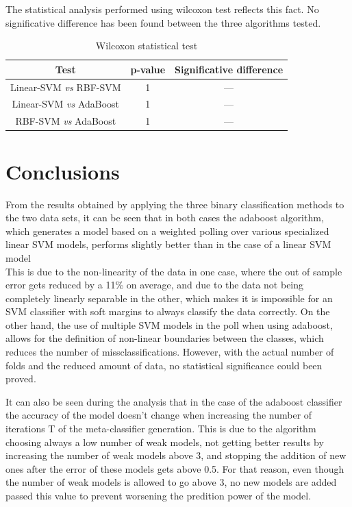 \documentclass[10pt, journal]{IEEEtran}
\begin{document}
The statistical analysis performed using wilcoxon test reflects this fact. No significative difference has been found between the three algorithms tested.\\
\begin{table}[ht!]
	\centering
	\begin{tabular}{|c|c|c|}
		\hline
		\textbf{Test} & \textbf{p-value} & \textbf{Significative difference}\\\hline
		Linear-SVM \emph{vs} RBF-SVM & 1 & —\\\hline
		Linear-SVM \emph{vs} AdaBoost & 1 & —\\\hline
		RBF-SVM \emph{vs} AdaBoost & 1 & —\\\hline
	\end{tabular}
	\label{tab:heartWilcoxonTest}
	\caption{Wilcoxon statistical test}
\end{table}

\section{Conclusions} %
\label{sec:conclusions}
From the results obtained by applying the three binary classification methods to the two data sets, it can be seen that in both cases the adaboost algorithm, which generates a model based on a weighted polling over various specialized linear SVM models, performs slightly better than in the case of a linear SVM model\\

This is due to the non-linearity of the data in one case, where the out of sample error gets reduced by a 11\% on average, and due to the data not being completely linearly separable in the other, which makes it is impossible for an SVM classifier with soft margins to always classify the data correctly. On the other hand, the use of multiple SVM models in the poll when using adaboost, allows for the definition of non-linear boundaries between the classes, which reduces the number of missclassifications. However, with the actual number of folds and the reduced amount of data, no statistical significance could been proved.

It can also be seen during the analysis that in the case of the adaboost classifier the accuracy of the model doesn't change when increasing the number of iterations T of the meta-classifier generation. This is due to the algorithm choosing always a low number of weak models, not getting better results by increasing the number of weak models above 3, and stopping the addition of new ones after the error of these models gets above 0.5. For that reason, even though the number of weak models is allowed to go above 3, no new models are added passed this value to prevent worsening the predition power of the model.\\
\end{document}
